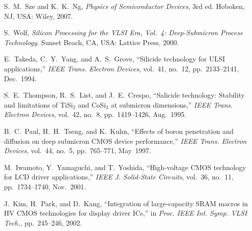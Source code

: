 \documentclass[conference]{IEEEtran}
\begin{document}
\begin{thebibliography}{8}

S.~M.~Sze and K.~K.~Ng, \emph{Physics of Semiconductor Devices}, 3rd ed.
Hoboken, NJ, USA: Wiley, 2007.

S.~Wolf, \emph{Silicon Processing for the VLSI Era, Vol.~4: Deep-Submicron Process Technology}.
Sunset Beach, CA, USA: Lattice Press, 2000.

E.~Takeda, C.~Y.~Yang, and A.~S.~Grove, ``Silicide technology for ULSI applications,''
\emph{IEEE Trans. Electron Devices}, vol.~41, no.~12, pp.~2133--2141, Dec.~1994.

S.~E.~Thompson, R.~S.~List, and J.~E.~Crespo,
``Salicide technology: Stability and limitations of TiSi$_2$ and CoSi$_2$ at submicron dimensions,''
\emph{IEEE Trans. Electron Devices}, vol.~42, no.~8, pp.~1419--1426, Aug.~1995.

B.~C.~Paul, H.~H.~Tseng, and K.~Kuhn,
``Effects of boron penetration and diffusion on deep submicron CMOS device performance,''
\emph{IEEE Trans. Electron Devices}, vol.~44, no.~5, pp.~765--771, May~1997.

M.~Iwamoto, Y.~Yamaguchi, and T.~Yoshida,
``High-voltage CMOS technology for LCD driver applications,''
\emph{IEEE J. Solid-State Circuits}, vol.~36, no.~11, pp.~1734--1740, Nov.~2001.

J.~Kim, H.~Park, and D.~Kang,
``Integration of large-capacity SRAM macros in HV CMOS technologies for display driver ICs,''
in \emph{Proc. IEEE Int. Symp. VLSI Tech.}, pp.~245--246, 2002.

\end{thebibliography}
\end{document}
